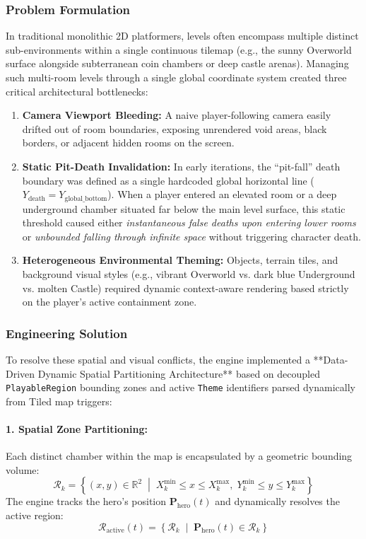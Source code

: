\subsubsection{Problem Formulation}
In traditional monolithic 2D platformers, levels often encompass multiple distinct sub-environments within a single continuous tilemap (e.g., the sunny Overworld surface alongside subterranean coin chambers or deep castle arenas). Managing such multi-room levels through a single global coordinate system created three critical architectural bottlenecks:
\begin{enumerate}
    \item \textbf{Camera Viewport Bleeding:} A naive player-following camera easily drifted out of room boundaries, exposing unrendered void areas, black borders, or adjacent hidden rooms on the screen.
    \item \textbf{Static Pit-Death Invalidation:} In early iterations, the ``pit-fall'' death boundary was defined as a single hardcoded global horizontal line ($Y_{\text{death}} = Y_{\text{global\_bottom}}$). When a player entered an elevated room or a deep underground chamber situated far below the main level surface, this static threshold caused either \textit{instantaneous false deaths upon entering lower rooms} or \textit{unbounded falling through infinite space} without triggering character death.
    \item \textbf{Heterogeneous Environmental Theming:} Objects, terrain tiles, and background visual styles (e.g., vibrant Overworld vs. dark blue Underground vs. molten Castle) required dynamic context-aware rendering based strictly on the player's active containment zone.
\end{enumerate}
\subsubsection{Engineering Solution}
To resolve these spatial and visual conflicts, the engine implemented a **Data-Driven Dynamic Spatial Partitioning Architecture** based on decoupled \texttt{PlayableRegion} bounding zones and active \texttt{Theme} identifiers parsed dynamically from Tiled map triggers:
\paragraph{1. Spatial Zone Partitioning:} Each distinct chamber within the map is encapsulated by a geometric bounding volume:
\begin{equation}
    \mathcal{R}_k = \left\{ (x, y) \in \mathbb{R}^2 \;\middle|\; X_k^{\min} \le x \le X_k^{\max}, \; Y_k^{\min} \le y \le Y_k^{\max} \right\}
\end{equation}
The engine tracks the hero's position $\mathbf{P}_{\text{hero}}(t)$ and dynamically resolves the active region:
\begin{equation}
    \mathcal{R}_{\text{active}}(t) = \left\{ \mathcal{R}_k \;\middle|\; \mathbf{P}_{\text{hero}}(t) \in \mathcal{R}_k \right\}
\end{equation}

